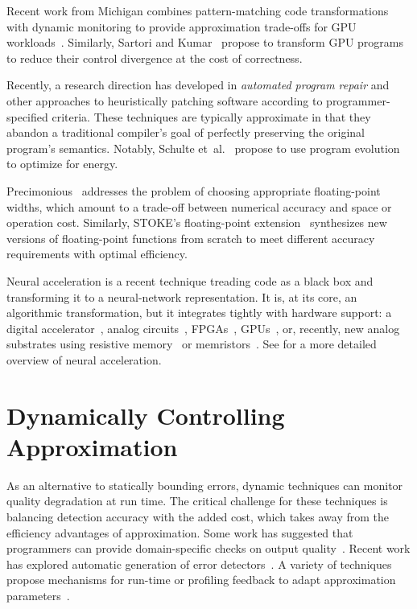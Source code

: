Recent work from Michigan combines pattern-matching code transformations with
dynamic monitoring to provide approximation trade-offs for GPU
workloads~\cite{paraprox, sage}.
Similarly, Sartori and Kumar~\cite{herding} propose to transform GPU programs
to reduce their control divergence at the cost of correctness.

Recently, a research direction has developed in \emph{automated program
repair} and other approaches to heuristically patching software according to
programmer-specified criteria.
These techniques are typically approximate in that they abandon a traditional
compiler's goal of perfectly preserving the original program's semantics.
Notably, Schulte et~al.~\cite{schulte} propose to use program evolution to
optimize for energy.

Precimonious~\cite{precimonious} addresses the problem of choosing appropriate
floating-point widths, which amount to a trade-off between numerical accuracy
and space or operation cost.
Similarly, STOKE's floating-point extension~\cite{stoke-fp} synthesizes new
versions of floating-point functions from scratch to meet different accuracy
requirements with optimal efficiency.

Neural acceleration is a recent technique treading code as a black box and
transforming it to a neural-network representation.
It is, at its core, an algorithmic transformation, but it integrates tightly
with hardware support: a digital accelerator~\cite{npu}, analog
circuits~\cite{anpu}, FPGAs~\cite{snnap},
GPUs~\cite{neuralgpu}, or, recently, new analog substrates using
resistive memory~\cite{rram-npu} or memristors~\cite{memristor-npu}.
See  for a more detailed overview of neural acceleration.


\section{Dynamically Controlling Approximation}

As an alternative to statically bounding errors, dynamic techniques can
monitor quality degradation at run time.
The critical challenge for these techniques is balancing detection accuracy
with the added cost, which takes away from the efficiency advantages of
approximation.
Some work has suggested that programmers can provide domain-specific checks on
output quality~\cite{lwc, approxdebug}.
Recent work has explored automatic generation of error detectors~\cite{rumba}.
A variety of techniques propose mechanisms for run-time or profiling feedback to adapt
approximation parameters~\cite{dynamicknobs, green, approxit, ansel-autotuning}.


